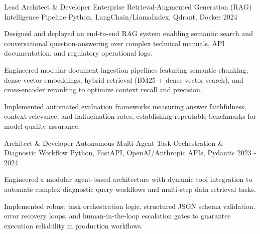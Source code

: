 

\begin{cventries}

  \cventry
    {Lead Architect \& Developer} %
    {Enterprise Retrieval-Augmented Generation (RAG) Intelligence Pipeline} %
    {Python, LangChain/LlamaIndex, Qdrant, Docker} %
    {2024} %
    {
      \begin{cvitems} %
        \item {Designed and deployed an end-to-end RAG system enabling semantic search and conversational question-answering over complex technical manuals, API documentation, and regulatory operational logs.}
        \item {Engineered modular document ingestion pipelines featuring semantic chunking, dense vector embeddings, hybrid retrieval (BM25 + dense vector search), and cross-encoder reranking to optimize context recall and precision.}
        \item {Implemented automated evaluation frameworks measuring answer faithfulness, context relevance, and hallucination rates, establishing repeatable benchmarks for model quality assurance.}
      \end{cvitems}
    }

  \cventry
    {Architect \& Developer} %
    {Autonomous Multi-Agent Task Orchestration \& Diagnostic Workflow} %
    {Python, FastAPI, OpenAI/Anthropic APIs, Pydantic} %
    {2023 - 2024} %
    {
      \begin{cvitems} %
        \item {Engineered a modular agent-based architecture with dynamic tool integration to automate complex diagnostic query workflows and multi-step data retrieval tasks.}
        \item {Implemented robust task orchestration logic, structured JSON schema validation, error recovery loops, and human-in-the-loop escalation gates to guarantee execution reliability in production workflows.}
      \end{cvitems}
    }


\end{cventries}
